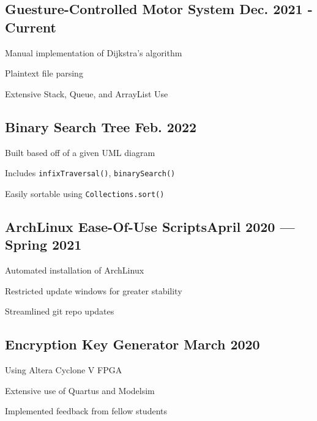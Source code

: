 \documentclass[letter,10pt]{article}
\begin{document}
\subsection{{Guesture-Controlled Motor System \hfill Dec. 2021 - Current}}
\begin{zitemize}
\item Manual implementation of Dijkstra's algorithm
\item Plaintext file parsing
\item Extensive Stack, Queue, and ArrayList Use
\end{zitemize}

\subsection{{Binary Search Tree \hfill Feb. 2022}}
\begin{zitemize}
\item Built based off of a given UML diagram
\item Includes \verb|infixTraversal()|, \verb|binarySearch()|
\item Easily sortable using \verb|Collections.sort()|
\end{zitemize}

\subsection{{ArchLinux Ease-Of-Use Scripts\hfill April 2020 --- Spring 2021}}
\begin{zitemize}
\item Automated installation of ArchLinux
\item Restricted update windows for greater stability
\item Streamlined git repo updates
\end{zitemize}

\subsection{{Encryption Key Generator \hfill March 2020}}
\begin{zitemize}
\item Using Altera Cyclone V FPGA
\item Extensive use of Quartus and Modelsim
\item Implemented feedback from fellow students
\end{zitemize}
\end{document}
